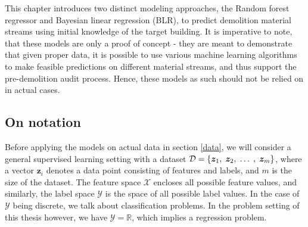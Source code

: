 \documentclass[english, 12pt, a4paper, sci, utf8, a-2b, online]{aaltothesis}
\begin{document}
This chapter introduces two distinct modeling approaches, the Random forest regressor and Bayesian linear regression (BLR), to predict demolition material streams using initial knowledge of the target
building. It is imperative to note, that these models are only a proof of concept - they are meant to demonstrate that given proper data, it is possible to use various machine learning algorithms
to make feasible predictions on different material streams, and thus support the pre-demolition audit process. Hence, these models as such should not be relied on in actual cases.


\subsection{On notation}

Before applying the models on actual data in section \ref{data}, we will consider a general supervised learning setting with a dataset
$\mathcal{D} = \{\bm{z}_1,\hspace{1mm} \bm{z}_2,\hspace{1mm} \ldots\hspace{1mm},\hspace{1mm} \bm{z}_m \}$, where a vector $\bm{z}_i$ denotes a data point consisting
of features and labels, and $m$ is the size of the dataset. The feature space $\mathcal{X}$ encloses all possible feature values, and similarly, the label space $\mathcal{Y}$ is the space
of all possible label values. In the case of $\mathcal{Y}$ being discrete, we talk about classification problems. In the problem setting of this thesis however, we have $\mathcal{Y} = \mathbb{R}$,
which implies a regression problem.
\end{document}
